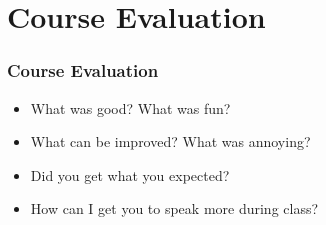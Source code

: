 \documentclass[10pt,handout]{beamer}
\begin{document}

\section{Course Evaluation}
\frame{\sectionpage}

\begin{frame}

\frametitle{Course Evaluation}

\begin{itemize}
\item What was good? What was fun?
\item What can be improved? What was annoying?
\item Did you get what you expected?
\item How can I get you to speak more during class?
\end{itemize}

\end{frame}


\end{document}
